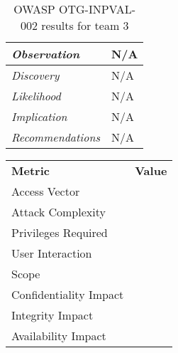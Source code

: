 \documentclass[headsepline,footsepline,footinclude=false,oneside,fontsize=11pt,paper=a4,listof=totoc,bibliography=totoc]{scrbook} %
\begin{document}
\begin{table}[H]
	\centering
	\begin{tabular}{l p{11cm}} 
		\textit{Observation} &  N/A\\ 
		\hline
		\textit{Discovery} &  N/A \\
		\hline
		\textit{Likelihood} & N/A\\
		\hline
		\textit{Implication} & N/A\\
		\hline
		\textit{Recommendations} & N/A\\ 
	\end{tabular}
	\caption{OWASP OTG-INPVAL-002 results for team 3}
	\label{table:scenario2}
\end{table}    
\vspace{0.5cm} 
\begin{center}
	\begin{tabular}{ll}
		\rowcolor[HTML]{34CDF9} 
		{\color[HTML]{ECF4FF} \textbf{Metric}}        & {\color[HTML]{ECF4FF} \textbf{Value}} \\
		\rowcolor[HTML]{BBDAFF} 
		{\color[HTML]{333333} Access Vector}          & {\color[HTML]{333333} }               \\
		\rowcolor[HTML]{ECF4FF} 
		{\color[HTML]{333333} Attack Complexity}      & {\color[HTML]{333333} }               \\
		\rowcolor[HTML]{BBDAFF} 
		{\color[HTML]{333333} Privileges Required}    & {\color[HTML]{333333} }               \\
		\rowcolor[HTML]{ECF4FF} 
		{\color[HTML]{333333} User Interaction}       & {\color[HTML]{333333} }               \\
		\rowcolor[HTML]{BBDAFF} 
		{\color[HTML]{333333} Scope}                  & {\color[HTML]{333333} }               \\
		\rowcolor[HTML]{ECF4FF} 
		{\color[HTML]{333333} Confidentiality Impact} & {\color[HTML]{333333} }               \\
		\rowcolor[HTML]{BBDAFF} 
		{\color[HTML]{333333} Integrity Impact}       & {\color[HTML]{333333} }               \\
		\rowcolor[HTML]{ECF4FF} 
		{\color[HTML]{333333} Availability Impact}    & {\color[HTML]{333333} }              
	\end{tabular}
\end{center}
\pagebreak 
\end{document}
